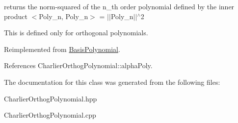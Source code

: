 returns the norm-\/squared of the n\+\_\+th order polynomial defined by the inner product $<$Poly\+\_\+n, Poly\+\_\+n$>$ = $\vert$$\vert$\+Poly\+\_\+n$\vert$$\vert$$^\wedge$2 

This is defined only for orthogonal polynomials. 

Reimplemented from \hyperlink{classPecos_1_1BasisPolynomial_ab74383be309d74823f2e5e85dad739b2}{Basis\+Polynomial}.



References Charlier\+Orthog\+Polynomial\+::alpha\+Poly.



The documentation for this class was generated from the following files\+:\begin{DoxyCompactItemize}
\item 
Charlier\+Orthog\+Polynomial.\+hpp\item 
Charlier\+Orthog\+Polynomial.\+cpp\end{DoxyCompactItemize}

